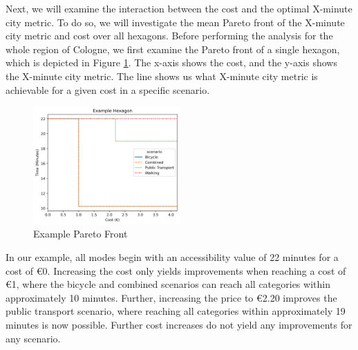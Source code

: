 Next, we will examine the interaction between the cost and the optimal X-minute city metric.
To do so, we will investigate the mean Pareto front of the X-minute city metric and cost over all hexagons.
Before performing the analysis for the whole region of Cologne, we first examine the Pareto front of a single hexagon, which is depicted in Figure \ref{fig:example_pareto_front}.
The x-axis shows the cost, and the y-axis shows the X-minute city metric.
The line shows us what X-minute city metric is achievable for a given cost in a specific scenario.

\begin{figure}
  \begin{center}
     \includegraphics[width=0.5\textwidth]{Figures/results/metric_cost/example_profile}
  \end{center}
  \caption{Example Pareto Front}
  \label{fig:example_pareto_front}
\end{figure}

In our example, all modes begin with an accessibility value of 22 minutes for a cost of \euro{0}.
Increasing the cost only yields improvements when reaching a cost of \euro{1}, where the bicycle and combined scenarios can reach all categories within approximately 10 minutes.
Further, increasing the price to \euro{2.20} improves the public transport scenario, where reaching all categories within approximately 19 minutes is now possible.
Further cost increases do not yield any improvements for any scenario.

